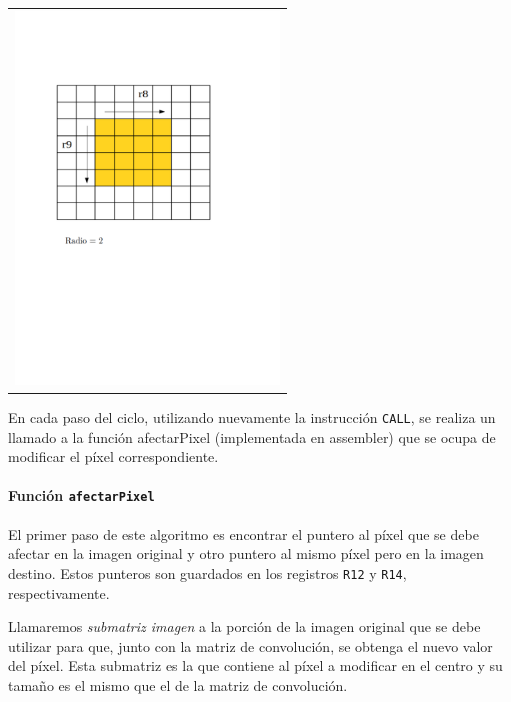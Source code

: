         {\centering \begin{tabular}{c}
          \includegraphics[width=7cm]{./imagenes/4bis.png} \\
        \end{tabular}}

      En cada paso del ciclo, utilizando nuevamente la instrucción \texttt{CALL}, se realiza un llamado a la función afectarPixel (implementada en assembler) que se ocupa de modificar el píxel correspondiente. 

      \paragraph{Función \texttt{afectarPixel}}
        El primer paso de este algoritmo es encontrar el puntero al píxel que se debe afectar en la imagen original y otro puntero al mismo píxel pero en la imagen destino. Estos punteros son guardados en los registros \texttt{R12} y \texttt{R14}, respectivamente.   

        Llamaremos \emph{submatriz imagen} a la porción de la imagen original que se debe utilizar para que, junto con la matriz de convolución, se obtenga el nuevo valor del píxel. Esta submatriz es la que contiene al píxel a modificar en el centro y su tamaño es el mismo que el de la matriz de convolución. 
        
